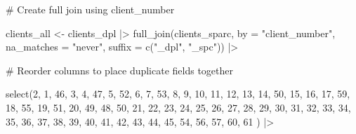 \documentclass[
  letterpaper,
  DIV=11,
  numbers=noendperiod]{scrartcl}
\newenvironment{Shaded}{\begin{snugshade}}{\end{snugshade}}
\newcommand{\AttributeTok}[1]{\textcolor[rgb]{0.40,0.45,0.13}{#1}}
\newcommand{\CommentTok}[1]{\textcolor[rgb]{0.37,0.37,0.37}{#1}}
\newcommand{\DecValTok}[1]{\textcolor[rgb]{0.68,0.00,0.00}{#1}}
\newcommand{\FunctionTok}[1]{\textcolor[rgb]{0.28,0.35,0.67}{#1}}
\newcommand{\NormalTok}[1]{\textcolor[rgb]{0.00,0.23,0.31}{#1}}
\newcommand{\OtherTok}[1]{\textcolor[rgb]{0.00,0.23,0.31}{#1}}
\newcommand{\SpecialCharTok}[1]{\textcolor[rgb]{0.37,0.37,0.37}{#1}}
\newcommand{\StringTok}[1]{\textcolor[rgb]{0.13,0.47,0.30}{#1}}
\begin{document}
\begin{Shaded}
\begin{Highlighting}[]
\CommentTok{\# Create full join using client\_number}

\NormalTok{clients\_all }\OtherTok{\textless{}{-}}\NormalTok{ clients\_dpl }\SpecialCharTok{|\textgreater{}} 
  \FunctionTok{full\_join}\NormalTok{(clients\_sparc, }\AttributeTok{by =} \StringTok{"client\_number"}\NormalTok{, }\AttributeTok{na\_matches =} \StringTok{"never"}\NormalTok{,}
            \AttributeTok{suffix =} \FunctionTok{c}\NormalTok{(}\StringTok{"\_dpl"}\NormalTok{, }\StringTok{"\_spc"}\NormalTok{)) }\SpecialCharTok{|\textgreater{}} 
  
  \CommentTok{\# Reorder columns to place duplicate fields together}
  
  \FunctionTok{select}\NormalTok{(}\DecValTok{2}\NormalTok{, }\DecValTok{1}\NormalTok{, }\DecValTok{46}\NormalTok{, }\DecValTok{3}\NormalTok{, }\DecValTok{4}\NormalTok{, }\DecValTok{47}\NormalTok{, }\DecValTok{5}\NormalTok{, }\DecValTok{52}\NormalTok{, }\DecValTok{6}\NormalTok{, }\DecValTok{7}\NormalTok{, }\DecValTok{53}\NormalTok{, }\DecValTok{8}\NormalTok{, }\DecValTok{9}\NormalTok{,}
         \DecValTok{10}\NormalTok{, }\DecValTok{11}\NormalTok{, }\DecValTok{12}\NormalTok{, }\DecValTok{13}\NormalTok{, }\DecValTok{14}\NormalTok{, }\DecValTok{50}\NormalTok{, }\DecValTok{15}\NormalTok{, }\DecValTok{16}\NormalTok{, }\DecValTok{17}\NormalTok{, }\DecValTok{59}\NormalTok{, }\DecValTok{18}\NormalTok{,}
         \DecValTok{55}\NormalTok{, }\DecValTok{19}\NormalTok{, }\DecValTok{51}\NormalTok{, }\DecValTok{20}\NormalTok{, }\DecValTok{49}\NormalTok{, }\DecValTok{48}\NormalTok{, }\DecValTok{50}\NormalTok{, }\DecValTok{21}\NormalTok{, }\DecValTok{22}\NormalTok{, }\DecValTok{23}\NormalTok{, }\DecValTok{24}\NormalTok{,}
         \DecValTok{25}\NormalTok{, }\DecValTok{26}\NormalTok{, }\DecValTok{27}\NormalTok{, }\DecValTok{28}\NormalTok{, }\DecValTok{29}\NormalTok{, }\DecValTok{30}\NormalTok{, }\DecValTok{31}\NormalTok{, }\DecValTok{32}\NormalTok{, }\DecValTok{33}\NormalTok{, }\DecValTok{34}\NormalTok{, }\DecValTok{35}\NormalTok{,}
         \DecValTok{36}\NormalTok{, }\DecValTok{37}\NormalTok{, }\DecValTok{38}\NormalTok{, }\DecValTok{39}\NormalTok{, }\DecValTok{40}\NormalTok{, }\DecValTok{41}\NormalTok{, }\DecValTok{42}\NormalTok{, }\DecValTok{43}\NormalTok{, }\DecValTok{44}\NormalTok{, }\DecValTok{45}\NormalTok{, }\DecValTok{54}\NormalTok{,}
         \DecValTok{56}\NormalTok{, }\DecValTok{57}\NormalTok{, }\DecValTok{60}\NormalTok{, }\DecValTok{61}
\NormalTok{         ) }\SpecialCharTok{|\textgreater{}} 
  

\end{Highlighting}
\end{Shaded}
\end{document}
